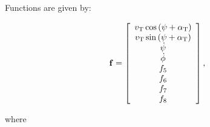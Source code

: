 \documentclass[sublist,a4paper,twoside,11pt]{article}
\begin{document}
Functions are given by:

\begin{equation} \label{functionNonlinear}
    {\bf f} = \left[ \begin{array}{c} v_{\rm T} \cos \left(\psi + \alpha_{\rm T} \right) \\ v_{\rm T} \sin \left(\psi + \alpha_{\rm T} \right) \\ \dot{\psi} \\ \dot{\phi} \\ f_5 \\ f_6 \\ f_7 \\ f_8 \\  \end{array} \right],
\end{equation}

where
\end{document}
